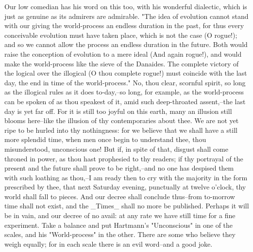 Our low comedian has his word on this too, with his wonderful
dialectic, which is just as genuine as its admirers are admirable.
"The idea of evolution cannot stand with our giving the world-process
an endless duration in the past, for thus every conceivable evolution
must have taken place, which is not the case (O rogue!); and so we
cannot allow the process an endless duration in the future. Both
would raise the conception of evolution to a mere ideal (And again
rogue!), and would make the world-process like the sieve of the
Danaides. The complete victory of the logical over the illogical (O
thou complete rogue!) must coincide with the last day, the end in
time of the world-process." No, thou clear, scornful spirit, so long
as the illogical rules as it does to-day,--so long, for example, as
the world-process can be spoken of as thou speakest of it, amid such
deep-throated assent,--the last day is yet far off. For it is still
too joyful on this earth, many an illusion still blooms here--like
the illusion of thy contemporaries about thee. We are not yet ripe to
be hurled into thy nothingness: for we believe that we shall have a
still more splendid time, when men once begin to understand thee,
thou misunderstood, unconscious one! But if, in spite of that,
disgust shall come throned in power, as thou hast prophesied to thy
readers; if thy portrayal of the present and the future shall prove
to be right,--and no one has despised them with such loathing as
thou,--I am ready then to cry with the majority in the form
prescribed by thee, that next Saturday evening, punctually at twelve
o'clock, thy world shall fall to pieces. And our decree shall
conclude thus--from to-morrow time shall not exist, and the _Times_
shall no more be published. Perhaps it will be in vain, and our
decree of no avail: at any rate we have still time for a fine
experiment. Take a balance and put Hartmann's "Unconscious" in one of
the scales, and his "World-process" in the other. There are some who
believe they weigh equally; for in each scale there is an evil
word--and a good joke.

